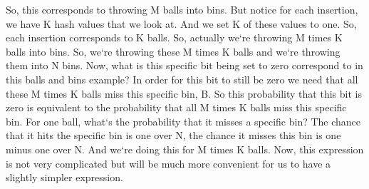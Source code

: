 So, this corresponds to throwing M balls into bins.
But notice for each insertion, we have K hash values that we look at.
And we set K of these values to one.
So, each insertion corresponds to K balls.
So, actually we`re throwing M times K balls into bins.
So, we`re throwing these M times K balls and we`re throwing them into N bins.
Now, what is this specific bit being set to zero correspond to in this balls and bins example? In order for this bit to still be zero we need that all these M times K balls miss this specific bin, B\@.
So this probability that this bit is zero is equivalent to the probability that all M times K balls miss this specific bin.
For one ball, what`s the probability that it misses a specific bin? The chance that it hits the specific bin is one over N, the chance it misses this bin is one minus one over N\@.
And we`re doing this for M times K balls.
Now, this expression is not very complicated but will be much more convenient for us to have a slightly simpler expression.

